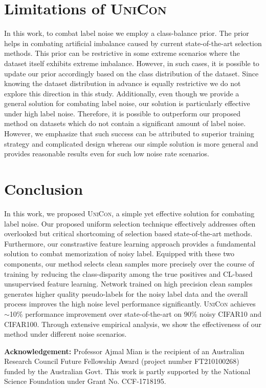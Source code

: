 \documentclass[10pt,twocolumn,letterpaper]{article}
\begin{document}
\section{Limitations of \textsc{UniCon}}
In this work, to combat label noise we employ a class-balance prior. The prior helps in combating artificial imbalance caused by current state-of-the-art selection methods. This prior can be restrictive in some extreme scenarios where the dataset itself exhibits extreme imbalance. However, in such cases, it is possible to update our prior accordingly based on the class distribution of the dataset. Since knowing the dataset distribution in advance is equally restrictive we do not explore this direction in this study. Additionally, even though we provide a general solution for combating label noise, our solution is particularly effective under high label noise. Therefore, it is possible to outperform our proposed method on datasets which do not contain a significant amount of label noise. However, we emphasize that such success can be attributed to superior training strategy and complicated design whereas our simple solution is more general and provides reasonable results even for such low noise rate scenarios.  
\section{Conclusion}
In this work, we proposed \textsc{UniCon}, a simple yet effective solution for combating label noise. Our proposed uniform selection technique effectively addresses often overlooked but critical shortcoming of selection based state-of-the-art methods. Furthermore, our constrastive feature learning approach provides a fundamental solution to combat memorization of noisy label. Equipped with these two components, our method selects clean samples more precisely over the course of training by reducing the class-disparity among the true positives and CL-based unsupervised feature learning. Network trained on high precision clean samples generates higher quality pseudo-labels for the noisy label data and the overall process improves the high noise level performance significantly. \textsc{UniCon} achieves  $\sim$10\% performance improvement over state-of-the-art on 90\% noisy CIFAR10 and CIFAR100. Through extensive empirical analysis, we show the effectiveness of our method under different noise scenarios. 

\textbf{Acknowledgement:} Professor Ajmal Mian is the recipient of an Australian Research Council Future Fellowship Award (project number FT210100268) funded by the Australian Govt. This work is partly supported by the National Science Foundation under Grant No. CCF-1718195. 
\end{document}
